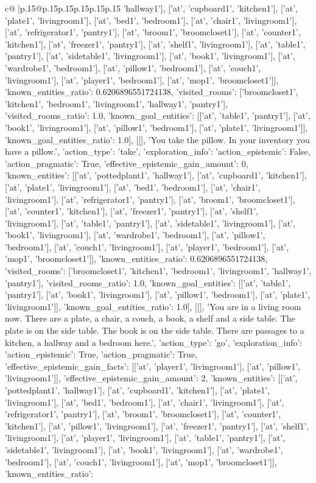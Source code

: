 \documentclass{article}
\begin{document}
{\begin{supertabular}{c@{$\;$}|p{.15\linewidth}@{}p{.15\linewidth}p{.15\linewidth}p{.15\linewidth}p{.15\linewidth}p{.15\linewidth}}
{{{'hallway1'], ['at', 'cupboard1', 'kitchen1'], ['at', 'plate1', 'livingroom1'], ['at', 'bed1', 'bedroom1'], ['at', 'chair1', 'livingroom1'], ['at', 'refrigerator1', 'pantry1'], ['at', 'broom1', 'broomcloset1'], ['at', 'counter1', 'kitchen1'], ['at', 'freezer1', 'pantry1'], ['at', 'shelf1', 'livingroom1'], ['at', 'table1', 'pantry1'], ['at', 'sidetable1', 'livingroom1'], ['at', 'book1', 'livingroom1'], ['at', 'wardrobe1', 'bedroom1'], ['at', 'pillow1', 'bedroom1'], ['at', 'couch1', 'livingroom1'], ['at', 'player1', 'bedroom1'], ['at', 'mop1', 'broomcloset1']], 'known_entities_ratio': 0.6206896551724138, 'visited_rooms': ['broomcloset1', 'kitchen1', 'bedroom1', 'livingroom1', 'hallway1', 'pantry1'], 'visited_rooms_ratio': 1.0, 'known_goal_entities': [['at', 'table1', 'pantry1'], ['at', 'book1', 'livingroom1'], ['at', 'pillow1', 'bedroom1'], ['at', 'plate1', 'livingroom1']], 'known_goal_entities_ratio': 1.0}}], [[], 'You take the pillow. In your inventory you have a pillow.', {'action_type': 'take', 'exploration_info': {'action_epistemic': False, 'action_pragmatic': True, 'effective_epistemic_gain_amount': 0, 'known_entities': [['at', 'pottedplant1', 'hallway1'], ['at', 'cupboard1', 'kitchen1'], ['at', 'plate1', 'livingroom1'], ['at', 'bed1', 'bedroom1'], ['at', 'chair1', 'livingroom1'], ['at', 'refrigerator1', 'pantry1'], ['at', 'broom1', 'broomcloset1'], ['at', 'counter1', 'kitchen1'], ['at', 'freezer1', 'pantry1'], ['at', 'shelf1', 'livingroom1'], ['at', 'table1', 'pantry1'], ['at', 'sidetable1', 'livingroom1'], ['at', 'book1', 'livingroom1'], ['at', 'wardrobe1', 'bedroom1'], ['at', 'pillow1', 'bedroom1'], ['at', 'couch1', 'livingroom1'], ['at', 'player1', 'bedroom1'], ['at', 'mop1', 'broomcloset1']], 'known_entities_ratio': 0.6206896551724138, 'visited_rooms': ['broomcloset1', 'kitchen1', 'bedroom1', 'livingroom1', 'hallway1', 'pantry1'], 'visited_rooms_ratio': 1.0, 'known_goal_entities': [['at', 'table1', 'pantry1'], ['at', 'book1', 'livingroom1'], ['at', 'pillow1', 'bedroom1'], ['at', 'plate1', 'livingroom1']], 'known_goal_entities_ratio': 1.0}}], [[], 'You are in a living room now. There are a plate, a chair, a couch, a book, a shelf and a side table. The plate is on the side table. The book is on the side table. There are passages to a kitchen, a hallway and a bedroom here.', {'action_type': 'go', 'exploration_info': {'action_epistemic': True, 'action_pragmatic': True, 'effective_epistemic_gain_facts': [['at', 'player1', 'livingroom1'], ['at', 'pillow1', 'livingroom1']], 'effective_epistemic_gain_amount': 2, 'known_entities': [['at', 'pottedplant1', 'hallway1'], ['at', 'cupboard1', 'kitchen1'], ['at', 'plate1', 'livingroom1'], ['at', 'bed1', 'bedroom1'], ['at', 'chair1', 'livingroom1'], ['at', 'refrigerator1', 'pantry1'], ['at', 'broom1', 'broomcloset1'], ['at', 'counter1', 'kitchen1'], ['at', 'pillow1', 'livingroom1'], ['at', 'freezer1', 'pantry1'], ['at', 'shelf1', 'livingroom1'], ['at', 'player1', 'livingroom1'], ['at', 'table1', 'pantry1'], ['at', 'sidetable1', 'livingroom1'], ['at', 'book1', 'livingroom1'], ['at', 'wardrobe1', 'bedroom1'], ['at', 'couch1', 'livingroom1'], ['at', 'mop1', 'broomcloset1']], 'known_entities_ratio': }}}
\end{supertabular}}
\end{document}
